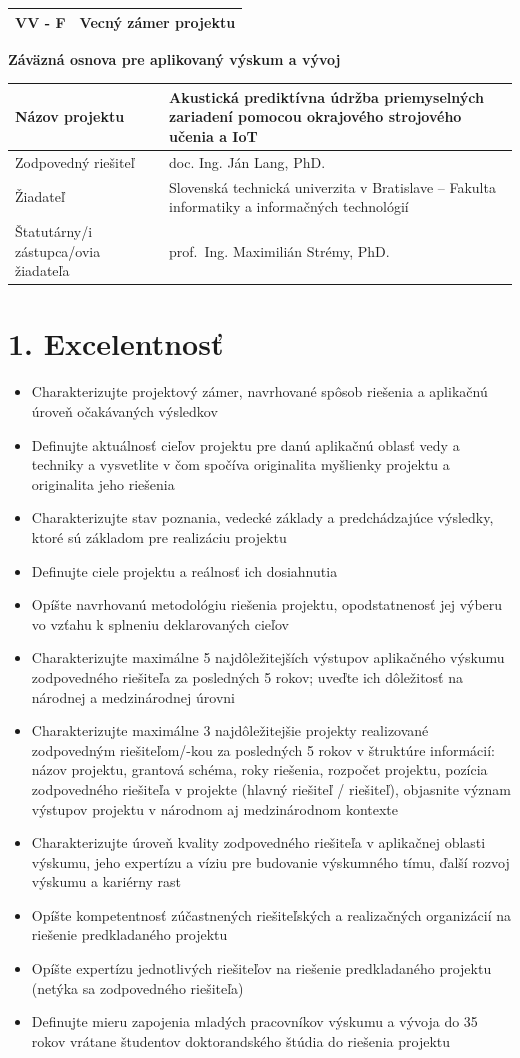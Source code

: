 \documentclass[10pt,a4paper]{article}
\newcommand{\vvheader}[1]{
  \noindent
  \begin{tabularx}{\textwidth}{|p{2cm}|X|}
  \hline
  VV - F & \hfill #1 \\
  \hline
  \end{tabularx}
  \vspace{10pt}
}
\newcommand{\projecttableSK}{
\begin{tabularx}{\textwidth}{|p{5cm}|X|}
\hline
Názov projektu &
Akustická prediktívna údržba priemyselných
zariadení pomocou okrajového strojového
učenia a IoT \\ \hline

Zodpovedný riešiteľ &
doc. Ing. Ján Lang, PhD. \\ \hline

Žiadateľ &
Slovenská technická univerzita v Bratislave
-- Fakulta informatiky a informačných
technológií \\ \hline

Štatutárny/i zástupca/ovia žiadateľa &
prof.~Ing. Maximilián Strémy, PhD. \\
\hline
\end{tabularx}
}
\begin{document}

\vvheader{Vecný zámer projektu}

\begin{center}
{\Large\bfseries
Záväzná osnova pre aplikovaný výskum a vývoj
}
\end{center}

\vspace{6pt}

\projecttableSK

\section*{1. Excelentnosť}

\begin{itemize}[leftmargin=1.5em,
                itemsep=0pt,
                topsep=2pt]
\item Charakterizujte projektový zámer, navrhované spôsob riešenia a aplikačnú úroveň očakávaných výsledkov
\item Definujte aktuálnosť cieľov projektu pre danú aplikačnú oblasť vedy a techniky a vysvetlite v čom spočíva originalita myšlienky projektu a originalita jeho riešenia
\item Charakterizujte stav poznania, vedecké základy a predchádzajúce výsledky, ktoré sú základom pre realizáciu projektu
\item Definujte ciele projektu a reálnosť ich dosiahnutia
\item Opíšte navrhovanú metodológiu riešenia projektu, opodstatnenosť jej výberu vo vzťahu k splneniu deklarovaných cieľov
\item Charakterizujte maximálne 5 najdôležitejších výstupov aplikačného výskumu zodpovedného riešiteľa za posledných 5 rokov; uveďte ich dôležitosť na národnej a medzinárodnej úrovni
\item Charakterizujte maximálne 3 najdôležitejšie projekty realizované zodpovedným riešiteľom/-kou za posledných 5 rokov v štruktúre informácií: názov projektu, grantová schéma, roky riešenia, rozpočet projektu, pozícia zodpovedného riešiteľa v projekte (hlavný riešiteľ / riešiteľ), objasnite význam výstupov projektu v národnom aj medzinárodnom kontexte
\item Charakterizujte úroveň kvality zodpovedného riešiteľa v aplikačnej oblasti výskumu, jeho expertízu a víziu pre budovanie výskumného tímu, ďalší rozvoj výskumu a kariérny rast
\item Opíšte kompetentnosť zúčastnených riešiteľských a realizačných organizácií na riešenie predkladaného projektu
\item Opíšte expertízu jednotlivých riešiteľov na riešenie predkladaného projektu (netýka sa zodpovedného riešiteľa)
\item Definujte mieru zapojenia mladých pracovníkov výskumu a vývoja do 35 rokov vrátane študentov doktorandského štúdia do riešenia projektu
\end{itemize}
\end{document}
